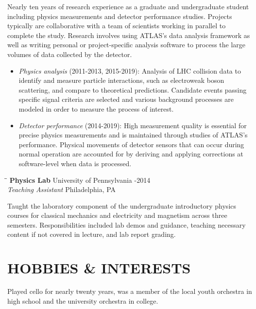 \documentclass{res}
\begin{document}
\begin{resume}
   Nearly ten years of research experience as a graduate and undergraduate student including physics measurements and detector performance studies.
   Projects typically are collaborative with a team of scientists working in parallel to complete the study.
   Research involves using ATLAS's data analysis framework as well as writing personal or project-specific analysis software to process the large volumes of data collected by the detector.
   \begin{itemize}
     \item {\it Physics analysis} (2011-2013, 2015-2019): Analysis of LHC collision data to identify and measure particle interactions, such as electroweak boson scattering, and compare to theoretical predictions.
           Candidate events passing specific signal criteria are selected and various background processes are modeled in order to measure the process of interest.
     \item {\it Detector performance} (2014-2019): High measurement quality is essential for precise physics measurements and is maintained through studies of ATLAS's performance.
           Physical movements of detector sensors that can occur during normal operation are accounted for by deriving and applying corrections at software-level when data is processed.
   \end{itemize}

   \vspace{-0.1in}	
   \begin{tabbing}
     \hspace{2.5in}\= \hspace{2.9in}\= \kill %
    {\bf Physics Lab} \>University of Pennsylvania     -2014\\
    {\it Teaching Assistant}  \>Philadelphia, PA
   \end{tabbing}\vspace{-18pt}      %
   Taught the laboratory component of the undergraduate introductory physics courses for classical mechanics and electricity and magnetism across three semesters.
   Responsibilities included lab demos and guidance, teaching necessary content if not covered in lecture, and lab report grading.

\newpage
\section{HOBBIES \& INTERESTS}
   Played cello for nearly twenty years, was a member of the local youth orchestra in high school and the university orchestra in college.


\end{resume}
\end{document}
